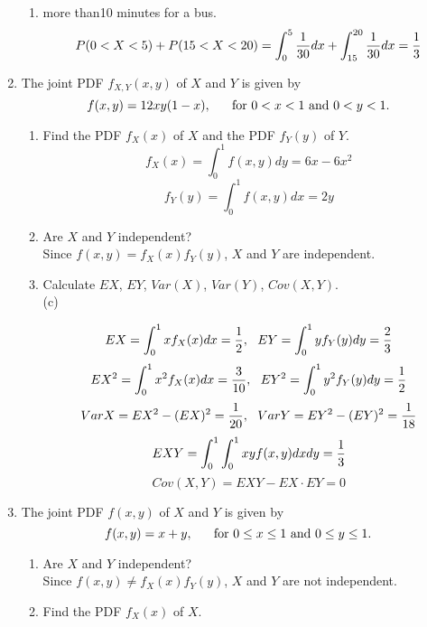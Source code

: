 \documentclass[12pt]{article}%
\newcommand{\0}{{\bf 0}}
\begin{document}
\begin{enumerate}
\begin{enumerate}
\item
more than10 minutes for a bus.
\\
{\color{blue}{\bf Sol.}}
$$P(0 < X <5) + P(15 < X <20) = \int_{0}^{5} \frac{1}{30} dx +\int_{15}^{20} \frac{1}{30} dx =\frac{1}{3}$$

\end{enumerate}








\item
The joint PDF $f_{X,Y}(x,y)$ of $X$ and $Y$ is given by
$$
f(x,y)=12xy(1-x),\ \ \ \ \ \mb{for $0<x<1$ and $0<y<1.$}
$$
\begin{enumerate}
\item
Find the PDF $f_{X}(x)$ of $X$ and the PDF $f_{Y}(y)$ of $Y$.
\\
{\color{blue}{\bf Sol.}}
$$f_X(x)=\int_0^1 f(x,y)dy=6x-6x^2$$
$$f_Y(y)=\int_0^1 f(x,y)dx=2y$$




\item
Are $X$ and $Y$ independent?
\\
{\color{blue}{\bf Sol.}}
Since $f(x,y) = f_X(x)f_Y(y)$, $X$ and $Y$ are independent.



\item
Calculate $EX$, $EY$, $Var(X)$, $Var(Y)$, $Cov(X,Y)$.
\\
{\color{blue}{\bf Sol.}}
(c)

$$EX=\int_0^1 xf_X(x)dx=\frac{1}{2},~~ EY=\int_0^1 yf_Y(y)dy=\frac{2}{3}$$
$$EX^2=\int_0^1 x^2f_X(x)dx=\frac{3}{10}, ~~ EY^2=\int_0^1 y^2f_Y(y)dy=\frac{1}{2}$$
$$VarX=EX^2-(EX)^2=\frac{1}{20}, ~~ VarY=EY^2-(EY)^2=\frac{1}{18}$$
$$EXY=\int_0^1 \int_0^1   xyf(x,y)dxdy=\frac{1}{3}$$
$$Cov(X,Y)=EXY-EX\cdot EY=0$$



\end{enumerate}






\item
The joint PDF $f(x,y)$ of $X$ and $Y$ is given by
$$
f(x,y)=x+y,\ \ \ \ \ \mbox{for $0\le x\le 1$ and $0\le y\le 1.$}
$$
\begin{enumerate}
\item
Are $X$ and $Y$ independent?
\\
{\color{blue}{\bf Sol.}}
 Since $f(x,y) \neq f_X(x)f_Y(y)$, $X$ and $Y$ are not independent.


\item
Find the PDF $f_{X}(x)$ of $X$.
\\
{\color{blue}{\bf Sol.}}


\end{enumerate}
\end{enumerate}
\end{document}
